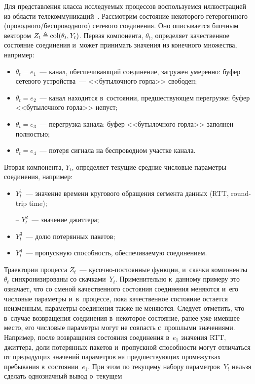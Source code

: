 \begin{multicols}{2}
Для представления класса исследуемых процессов воспользуемся иллюстрацией из 
области телекоммуникаций~\cite{B_14, B_16_1, B_16_2, G_23_1, B_21_1}. Рассмотрим 
состояние некоторого гетерогенного (про\-вод\-но\-го/бес\-про\-вод\-но\-го) сетевого 
соединения. Оно описывается блочным вектором $Z_t \hm\ebd \mathrm{col}(\theta_t, Y_t)$. 
Первая компонента, $\theta_t$, определяет качественное состояние соединения 
и~может принимать значения из конечного множества, например:
\begin{itemize}
\item
$\theta_t=e_1$~--- канал, обеспечивающий
 соединение, загружен умеренно: буфер сетевого устройства~--- <<бутылочного 
горла>> свободен;
\item
$\theta_t=e_2$~--- канал находится в~состоянии, предшествующем перегрузке: буфер 
<<бутылочного горла>> непуст;
\item
$\theta_t=e_3$~--- перегрузка канала: буфер <<бутылочного горла>> заполнен 
полностью;
\item
$\theta_t=e_4$~--- потеря сигнала на беспроводном участке канала.
\end{itemize}
Вторая компонента, $Y_t$, определяет текущие средние числовые параметры 
соединения, например:
\begin{itemize}
\item
$Y_t^1$~--- значение времени кругового обращения сегмента данных (RTT, round-trip time);
\item[--]
$Y_t^2$~--- значение джиттера;
\item
$Y_t^3$~--- долю потерянных пакетов;
\item
$Y_t^4$~--- пропускную способность, обес\-пе\-чи\-ва\-емую соединением.
\end{itemize}
Траектории процесса $Z_t$~--- ку\-соч\-но-по\-сто\-ян\-ные функции, и~скачки компоненты~$\theta_t$ 
синхронизированы со скачками~$Y_t$. Применительно к~данному примеру 
это означает, что со сменой качественного состояния соединения меняются и~его 
числовые параметры и~в~процессе, пока качественное состояние остается 
неизменным, параметры соединения также не меняются. Следует отметить, что 
в~случае возвращения соединения в~некоторое состояние, ранее уже имевшее место, 
его чис\-ло\-вые па\-ра\-мет\-ры могут не совпасть с~прошлыми значениями. Например, после 
возвращения состояния соединения в~$e_1$ значения RTT, джиттера, доли потерянных 
пакетов и~пропускной способности могут отличаться от предыдущих значений 
параметров на предшествующих промежутках пребывания в~состоянии~$e_1$. При этом 
по текущему набору па\-ра\-мет\-ров~$Y_t$ \mbox{нельзя} сделать однозначный вывод о~текущем 

\end{multicols}
